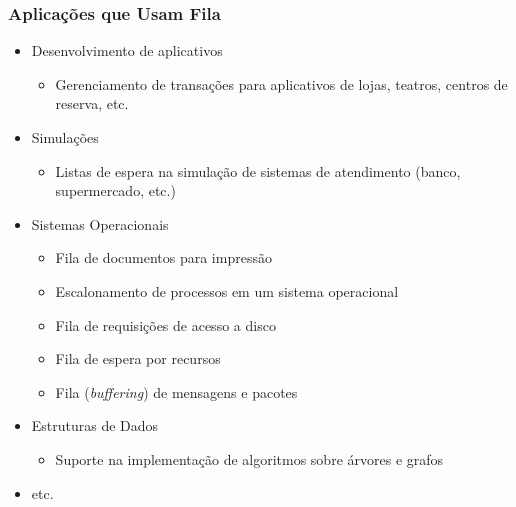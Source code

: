 \documentclass[aspectratio=169]{beamer}
\begin{document}
\begin{frame}\frametitle{Aplicações que Usam Fila}
\begin{itemize}
	\item Desenvolvimento de aplicativos
	\begin{itemize}
		\item Gerenciamento de transações para aplicativos de lojas, teatros, centros de reserva, etc.
	\end{itemize}
	\item Simulações
	\begin{itemize}
		\item Listas de espera na simulação de sistemas de atendimento (banco, supermercado, etc.)
	\end{itemize}
	\item Sistemas Operacionais
	\begin{itemize}
		\item Fila de documentos para impressão
		\item Escalonamento de processos em um sistema operacional
		\item Fila de requisições de acesso a disco
		\item Fila de espera por recursos
		\item Fila (\emph{buffering}) de mensagens e pacotes
	\end{itemize}
	\item Estruturas de Dados
	\begin{itemize}
		\item Suporte na implementação de algoritmos sobre árvores e grafos
	\end{itemize}
	\item etc.
\end{itemize}
\end{frame}
\end{document}
